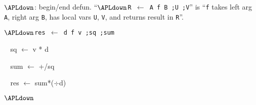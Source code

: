 $\APLdown$: begin/end defun.
``{\tt $\APLdown$R $\leftarrow$ A f B ;U ;V}'' is
``{\tt f} takes left arg {\tt A},
right arg {\tt B}, has local vars {\tt U},
{\tt V}, and returns result in {\tt R}''.

{\tt $\APLdown$res $\leftarrow$ d f v ;sq ;sum

$\;\;$  sq $\leftarrow$ v * d

$\;\;$  sum $\leftarrow$ +/sq

$\;\;$  res $\leftarrow$ sum*($\div$d)

$\APLdown$}




\copyrightnotice

\bye

